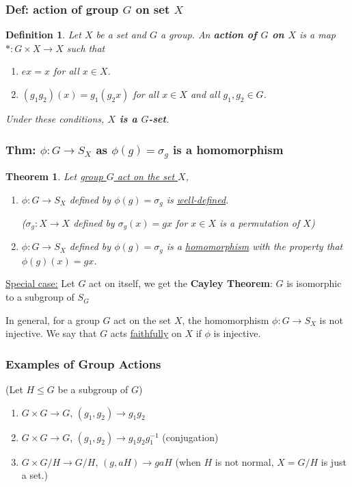 \documentclass[11pt,a4paper]{article}
\newtheorem{theorem}{Theorem}
\newtheorem{definition}{Definition}
\begin{document}
\subsubsection{Def: action of group $G$ on set $X$}
\begin{definition}
    Let $X$ be a set and $G$ a group. An \textbf{action of $G$ on $X$} is a map $*:G\times X \rightarrow	X$ such that
    \begin{enumerate}[(1)]
        \item $ex=x$ for all $x\in X$.
        \item $(g_1g_2)(x) = g_1(g_2x)$ for all $x \in X$ and all $g_1,g_2\in G$.
    \end{enumerate}
    Under these conditions, \textbf{$X$ is a $G$-set}.
\end{definition}

\subsubsection{Thm: $\phi: G \rightarrow S_X$ as $\phi(g) = \sigma_g$ is a homomorphism}
\begin{theorem}
Let \underline{group $G$ act on the set $X$},
\begin{enumerate}[$(1)$]
    \item $\phi: G \rightarrow S_X$ defined by $\phi(g) = \sigma_g$ is \underline{well-defined}.
    
    ($\sigma_g:X \rightarrow X$ defined by $\sigma_g(x)=gx$ for $x\in X$ is a permutation of $X$)
    \item $\phi: G \rightarrow S_X$ defined by $\phi(g) = \sigma_g$ is a \underline{homomorphism} with the property that $\phi(g)(x) = gx$.
\end{enumerate}
\end{theorem}
\underline{Special case:} Let $G$ act on itself, we get the \textbf{Cayley Theorem}: $G$ is isomorphic to a subgroup of $S_G$

In general, for a group $G$ act on the set $X$, the homomorphism $\phi:G \rightarrow S_X$ is not injective. We say that $G$ acts \underline{faithfully} on $X$ if $\phi$ is injective.

\subsubsection{Examples of Group Actions}
(Let $H \leq G$ be a subgroup of $G$)
\begin{enumerate}[$(1)$]
    \item $G\times G \rightarrow G$, $(g_1,g_2)\rightarrow g_1g_2$
    \item $G\times G \rightarrow G$, $(g_1,g_2)\rightarrow g_1g_2g_1^{-1}$ (conjugation)
    \item $G\times G/H \rightarrow G/H$, $(g,aH)\rightarrow gaH$ (when $H$ is not normal, $X=G/H$ is just a set.)
\end{enumerate}
\end{document}
